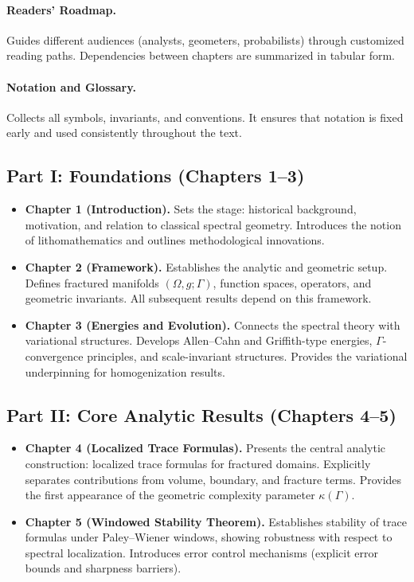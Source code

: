 \paragraph{Readers’ Roadmap.}
Guides different audiences (analysts, geometers, probabilists) through
customized reading paths. Dependencies between chapters are summarized
in tabular form.

\paragraph{Notation and Glossary.}
Collects all symbols, invariants, and conventions. It ensures that
notation is fixed early and used consistently throughout the text.

\subsection*{Part I: Foundations (Chapters 1–3)}

\begin{itemize}
  \item \textbf{Chapter 1 (Introduction).}  
  Sets the stage: historical background, motivation, and relation to
  classical spectral geometry. Introduces the notion of lithomathematics
  and outlines methodological innovations.

  \item \textbf{Chapter 2 (Framework).}  
  Establishes the analytic and geometric setup. Defines fractured
  manifolds $(\Omega, g; \Gamma)$, function spaces, operators, and
  geometric invariants. All subsequent results depend on this framework.

  \item \textbf{Chapter 3 (Energies and Evolution).}  
  Connects the spectral theory with variational structures. Develops
  Allen–Cahn and Griffith-type energies, $\Gamma$-convergence
  principles, and scale-invariant structures. Provides the variational
  underpinning for homogenization results.
\end{itemize}

\subsection*{Part II: Core Analytic Results (Chapters 4–5)}

\begin{itemize}
  \item \textbf{Chapter 4 (Localized Trace Formulas).}  
  Presents the central analytic construction: localized trace formulas
  for fractured domains. Explicitly separates contributions from volume,
  boundary, and fracture terms. Provides the first appearance of the
  geometric complexity parameter $\kappa(\Gamma)$.

  \item \textbf{Chapter 5 (Windowed Stability Theorem).}  
  Establishes stability of trace formulas under Paley–Wiener windows,
  showing robustness with respect to spectral localization. Introduces
  error control mechanisms (explicit error bounds and sharpness
  barriers).
\end{itemize}

